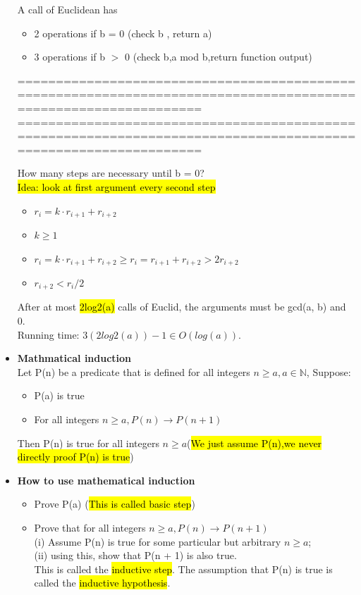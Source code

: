 \documentclass{article}
\begin{document}
\begin{itemize}
 A call of Euclidean has 
 \begin{itemize}
 \item 2 operations if b = 0 (check b , return a)
 \item 3 operations if b $>$ 0 (check b,a mod b,return function output)
 \end{itemize}


================================================================================================================
\newpage
================================================================================================================

How many steps are necessary until b = 0?\\
\hl{Idea: look at first argument every second step}
 \begin{itemize}
\item $r_i = k \cdot r_{i+1} + r_{i+2}$
\item $k \geq 1$
\item $r_i = k \cdot r_{i+1} + r_{i+2} \geq r_i = r_{i+1} + r_{i+2} > 2r_{i+2}$
\item $r_{i+2} < r_i / 2$
 \end{itemize}
 After at most \hl{2log2(a)} calls of Euclid, the arguments must be
gcd(a, b) and 0.\\

Running time: $3(2 log2(a)) - 1 \in O(log(a))$.
\item \textbf{Mathmatical induction}\\
Let P(n) be a predicate that is defined for all integers $n \geq a, a \in \mathbb{N}$, Suppose:
 \begin{itemize}
\item P(a) is true
\item For all integers  $n \geq a, P(n) \rightarrow P(n+1)$
 \end{itemize}
 Then P(n) is true for all integers $n \geq a$(\hl{We just assume P(n),we never directly proof P(n) is true})
 
\item \textbf{How to use mathematical induction}
 \begin{itemize}
\item Prove P(a) (\hl{This is called basic step})
\item Prove that for all integers  $n \geq a, P(n) \rightarrow P(n+1)$\\
(i) Assume P(n) is true for some particular but arbitrary $n  \geq a$;\\
(ii) using this, show that P(n + 1) is also true.\\
This is called the \hl{inductive step}.
The assumption that P(n) is true is called the
\hl{inductive hypothesis}.
 \end{itemize}



\end{itemize}
\end{document}
